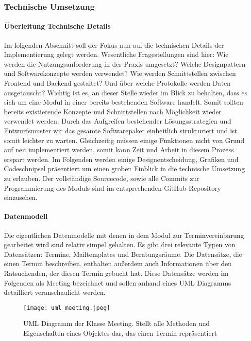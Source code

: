 \subsubsection{Technische Umsetzung}

\paragraph{Überleitung Technische Details}
Im folgenden Abschnitt soll der Fokus nun auf die technischen Details der
Implementierung gelegt werden. Wesentliche Fragestellungen sind hier: Wie
werden die Nutzungsanforderung in der Praxis umgesetzt? Welche Designpattern
und Softwarekonzepte werden verwendet? Wie werden Schnittstellen zwischen
Frontend und Backend gestaltet? Und über welche Protokolle werden Daten
ausgetauscht? Wichtig ist es, an dieser Stelle wieder im Blick zu behalten,
dass es sich um eine Modul in einer bereits bestehenden Software handelt. Somit
sollten bereits existierende Konzepte und Schnittstellen nach Möglichkeit
wieder verwendet werden. Durch das Aufgreifen bestehender Lösungsstrategien und
Entwurfsmuster wir das gesamte Softwarepaket einheitlich strukturiert und ist
somit leichter zu warten. Gleichzeitig müssen einige Funktionen nicht von Grund
auf neu implementiert werden, somit kann Zeit und Arbeit in diesem Prozess
erspart werden.\cite{wiederverwSoftware} Im Folgenden werden einige
Designentscheidung, Grafiken und Codeschnipsel präsentiert um einen groben
Einblick in die technische Umsetzung zu erlauben. Der vollständige Sourcecode,
sowie alle Commits zur Programmierung des Moduls sind im entsprechenden GitHub
Repository einzusehen.\cite{stubegruRepo}

\paragraph{Datenmodell}
Die eigentlichen Datenmodelle mit denen in dem Modul zur Terminvereinbarung
gearbeitet wird sind relativ simpel gehalten. Es gibt drei relevante Typen von
Datensätzen: Termine, Mailtemplates und Beratungsräume. Die Datensätze, die
einen Termin beschreiben, enthalten außerdem auch Informationen über den
Ratsuchenden, der diesen Termin gebucht hat. Diese Datensätze werden im
Folgenden als Meeting bezeichnet und sollen anhand eines UML Diagramms
detailliert veranschaulicht werden.

\begin{figure}[H]
    \caption{UML Diagramm der Klasse Meeting. Stellt alle Methoden und Eigenschaften eines Objektes dar, das einen Termin repräsentiert}
    \centering
    \texttt{[image: uml\_meeting.jpeg]}
\end{figure}

